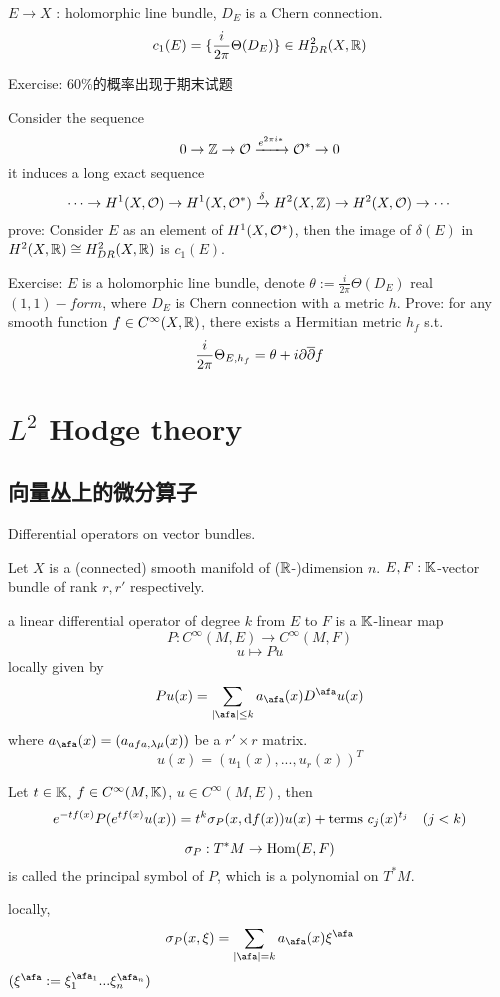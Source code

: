 $E\to X$ : holomorphic line bundle, $D_E$ is a Chern connection.
$$c_1(E)=\{\frac{i}{2\pi}\Theta(D_E)\}\in H_{DR}^2(X,\mathbb{R})$$

Exercise:
{\color{red} $60\%$的概率出现于期末试题}

Consider the sequence 
$$0\to\mathbb{Z}\to\mathcal{O}\xrightarrow{e^{2\pi i *}}\mathcal{O}^*\to 0$$
it induces a long exact sequence 
$$\cdots\to
H^1(X,\mathcal{O})\to H^1(X,\mathcal{O}^*)\xrightarrow{\delta}H^2(X,\mathbb{Z})\to H^2(X,\mathcal{O})\to\cdots
$$
prove: Consider $E$ as an element of $H^1(X,\mathcal{O}^*)$, then the 
image of $\delta(E)$ in $H^2(X,\mathbb{R})\cong H^2_{DR}(X,\mathbb{R})$ is $c_1(E)$.

Exercise: $E$ is a holomorphic line bundle, denote 
$\theta:=\frac{i}{2\pi}\Theta(D_E)$ real $(1,1)-form$,
where $D_E$ is Chern connection
with a metric $h$.
Prove: for any smooth function $f\in C^\infty(X,\mathbb{R})$, 
there exists a Hermitian metric $h_f$ s.t.
$$\frac{i}{2\pi}\Theta_{E,h_f}=\theta+i\partial\overline{\partial} f$$

\chapter{$L^2$ Hodge theory}

\section{向量丛上的微分算子}
Differential operators on vector bundles.

Let $X$ is a (connected) smooth manifold of ($\mathbb{R}$-)dimension $n$.
$E,F:\mathbb{K}$-vector bundle of rank $r,r'$ respectively.

\begin{definition}
a linear differential operator of degree $k$ from $E$ to $F$ is a $\mathbb{K}$-linear map 
$$P:C^\infty(M,E)\to C^\infty(M,F)$$
$$u\mapsto Pu$$
locally given by 
$$Pu(x)=\sum_{|\afa|\leq k}a_{\afa}(x)D^\afa u(x)$$
where $a_\afa(x)=(a_{afa,\lmd\mu}(x))$ be a $r'\times r$ matrix.
$$
u(x)=(u_1(x),...,u_r(x))^T
$$
\end{definition}

Let $t\in\mathbb{K}$, $f\in C^\infty(M,\mathbb{K})$, $u\in C^\infty(M,E)$,
then 
$$e^{-tf(x)}P(e^{tf(x)}u(x))=
t^k\sigma_P(x,\mathrm{d} f(x))u(x)+\text{terms } c_j(x)^{t_j}\quad(j<k)$$
\begin{definition}
$$\sigma_P:T^*M\to\operatorname{Hom}(E,F)$$
is called the principal symbol of $P$, which is a polynomial on $T^*M$.
\end{definition}
locally, 
$$\sgm_P(x,\xi)=\sum_{|\afa|=k}a_\afa(x)\xi^\afa$$
$(\xi^\afa:=\xi_1^{\afa_1}...\xi_n^{\afa_n})$

